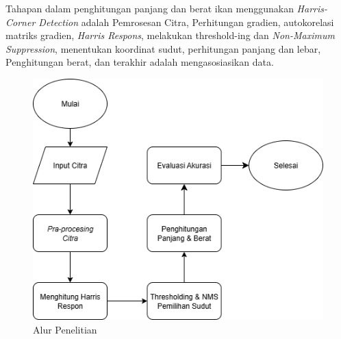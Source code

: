 Tahapan dalam penghitungan panjang dan berat ikan menggunakan \emph{Harris-Corner Detection} adalah Pemrosesan Citra, Perhitungan gradien, autokorelasi matriks gradien, \emph{Harris Respons}, melakukan threshold-ing dan \emph{Non-Maximum Suppression}, menentukan koordinat sudut, perhitungan panjang dan lebar, Penghitungan berat, dan terakhir adalah mengasosiasikan data.


\begin{figure}
    \centering
    \includegraphics[scale= 0.7]{gambar/Alur Penelitian.png}
    \caption{Alur Penelitian}\label{Alur Penelitian}
\end{figure}

